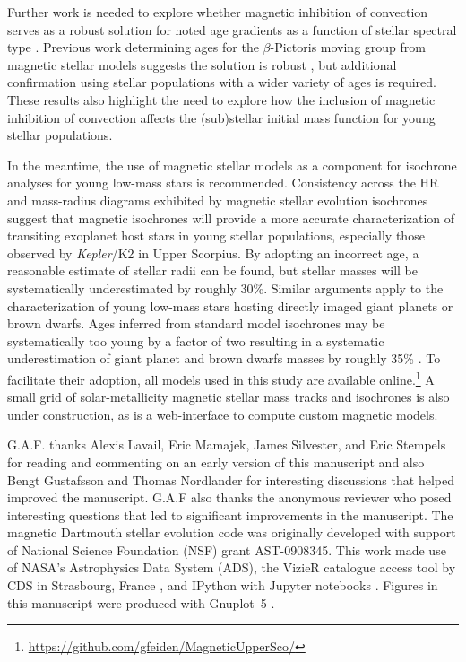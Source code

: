 \documentclass{aa}
\begin{document}
Further work is needed to explore whether magnetic inhibition of convection serves as a robust solution for noted age gradients as a function of stellar spectral type \citep[e.g.,][]{Naylor2009, Herczeg2015}. Previous work determining ages for the $\beta$-Pictoris moving group from magnetic stellar models suggests the solution is robust \citep{MM10, Malo2014, Binks2016}, but additional confirmation using stellar populations with a wider variety of ages is required. These results also highlight the need to explore how the inclusion of magnetic inhibition of convection affects the (sub)stellar initial mass function for young stellar populations.

In the meantime, the use of magnetic stellar models as a component for isochrone analyses for young low-mass stars is recommended. Consistency across the HR and mass-radius diagrams exhibited by magnetic stellar evolution isochrones suggest that magnetic isochrones will provide a more accurate characterization of transiting exoplanet host stars in young stellar populations, especially those observed by \emph{Kepler}/K2 in Upper Scorpius. By adopting an incorrect age, a reasonable estimate of stellar radii can be found, but stellar masses will be systematically underestimated by roughly 30\%. Similar arguments apply to the characterization of young low-mass stars hosting directly imaged giant planets or brown dwarfs. Ages inferred from standard model isochrones may be systematically too young by a factor of two resulting in a systematic underestimation of giant planet and brown dwarfs masses by roughly 35\% \citep{Baraffe2003}. To facilitate their adoption, all models used in this study are available online.\footnote{\url{https://github.com/gfeiden/MagneticUpperSco/}} A small grid of solar-metallicity magnetic stellar mass tracks and isochrones is also under construction, as is a web-interface to compute custom magnetic models.

\begin{acknowledgements}
G.A.F. thanks Alexis Lavail, Eric Mamajek, James Silvester, and Eric Stempels for reading and commenting on an early version of this manuscript and also Bengt Gustafsson and Thomas Nordlander for interesting discussions that helped improved the manuscript. G.A.F also thanks the anonymous reviewer who posed interesting questions that led to significant improvements in the manuscript. The magnetic Dartmouth stellar evolution code was originally developed with support of National Science Foundation (NSF) grant AST-0908345. This work made use of NASA's Astrophysics Data System (ADS), the VizieR catalogue access tool by CDS in Strasbourg, France \citep{Ochsenbein2000}, and IPython with Jupyter notebooks \citep{Perez2007}. Figures in this manuscript were produced with Gnuplot~5 \citep{Gnuplot5.0}.
\end{acknowledgements}
\end{document}
